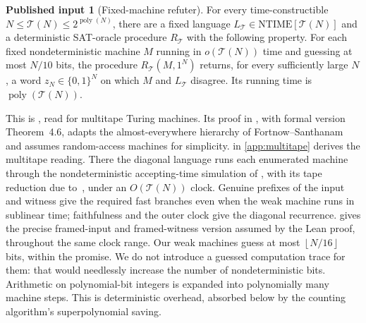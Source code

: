 \documentclass[11pt,letterpaper]{article}
\theoremstyle{definition}
\newtheorem{import}[theorem]{Published input}
\theoremstyle{remark}
\newcommand{\NTIME}{\mathrm{NTIME}}
\newcommand{\poly}{\operatorname{poly}}
\newcommand{\floor}[1]{\left\lfloor #1\right\rfloor}
\newcommand{\Tclk}{\mathcal T}
\begin{document}
\begin{import}[Fixed-machine refuter]\label{imp:ae-refuter}
For every time-constructible \(N\le \Tclk(N)\le2^{\poly(N)}\), there
are a fixed language \(L_{\Tclk}\in\NTIME[\Tclk(N)]\) and a deterministic
SAT-oracle procedure \(R_{\Tclk}\) with the following property. For each
fixed nondeterministic machine \(M\) running in \(o(\Tclk(N))\) time
and guessing at most \(N/10\) bits, the procedure
\(R_{\Tclk}(M,1^N)\) returns, for every sufficiently large \(N\), a word
\(z_N\in\{0,1\}^N\) on which \(M\) and \(L_{\Tclk}\) disagree.
Its running time is \(\poly(\Tclk(N))\).
\end{import}
This is \cite[Theorem~1.13]{CLW20}, read for multitape Turing machines.
Its proof in \cite[Section~4]{CLW20}, with formal version Theorem~4.6,
adapts the almost-everywhere hierarchy of Fortnow--Santhanam~\cite{FS16}
and assumes random-access machines for simplicity. 
in \cref{app:multitape} derives the multitape reading. There the
diagonal language runs each enumerated machine through the
nondeterministic accepting-time simulation of
\cite[Lemma~3 and Condition~2]{SFM78}, with its tape reduction due
to~\cite{BGW70}, under an \(O(\Tclk(N))\) clock. Genuine prefixes of
the input and witness give the required fast branches even when the
weak machine runs in sublinear time; faithfulness and the outer clock
give the diagonal recurrence.  gives the precise
framed-input and framed-witness version assumed by the Lean proof,
throughout the same clock range. Our weak machines
guess at most \(\floor{N/16}\) bits, within the promise. We do not
introduce a guessed computation trace for them: that would needlessly
increase the number of nondeterministic bits. Arithmetic on
polynomial-bit integers is expanded into polynomially many machine
steps. This is deterministic overhead, absorbed below by the counting
algorithm's superpolynomial saving.
\end{document}
